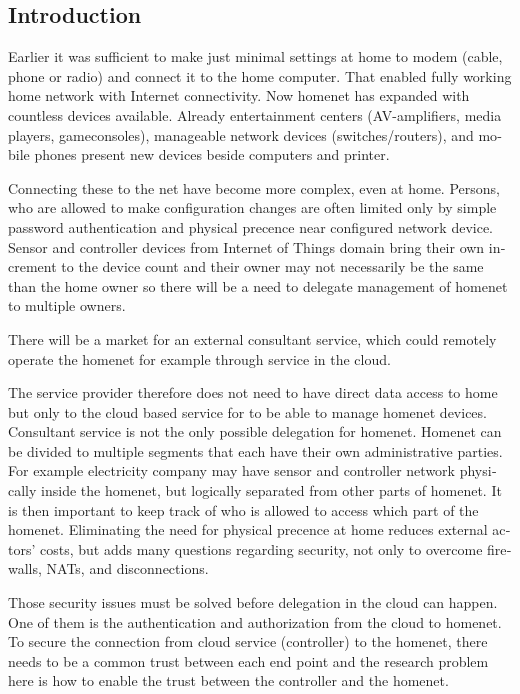 \documentclass[12pt,a4paper,english]{tutthesis}
\begin{document}
\begin{otherlanguage}{english}
\chapter{Introduction}
\label{sec-1}
\label{cha:intro}



Earlier it was sufficient to make just minimal settings at home to
modem (cable, phone or radio) and connect it to
the home computer. That enabled fully working home network
with Internet connectivity.  Now homenet has expanded with countless
devices available.
Already entertainment centers (AV-amplifiers, media players, gameconsoles),
manageable network devices (switches/routers), and mobile phones
present new devices beside computers and printer.

Connecting these to the net have become more complex, even at home.
Persons, who are allowed to make configuration changes are often
limited only by simple password authentication and physical precence
near configured network device.
 Sensor and controller devices from Internet of Things domain bring
their own increment to the device count and their owner may not
necessarily be the same than the home owner so there will be a need to
delegate management of homenet to multiple owners.  



There will be a market for an external consultant service, which could
remotely operate the homenet for example through service in the cloud. 

The service provider therefore does not need to have direct data
access to home but only to the cloud based service for to be able to
manage homenet devices.
Consultant service is not the only possible delegation for homenet.
Homenet can be divided to multiple segments that each have
their own administrative parties. For example electricity company may
have sensor and controller network physically inside the homenet, but
logically separated from other parts of homenet. It is then
important to keep track of who is allowed to access which part of the homenet.
Eliminating the need for 
physical precence at home reduces external actors' costs, but adds many questions
regarding security, not only to overcome firewalls, NATs, and disconnections.







Those security issues must be solved before delegation in the cloud can
happen. One of them is the authentication and authorization 
from the cloud to homenet.
To secure the connection from cloud service (controller)
to the homenet, there needs to be a common trust between each end
point and the research problem here is how to enable the trust between the
controller and the homenet.  


\end{otherlanguage}
\end{document}
